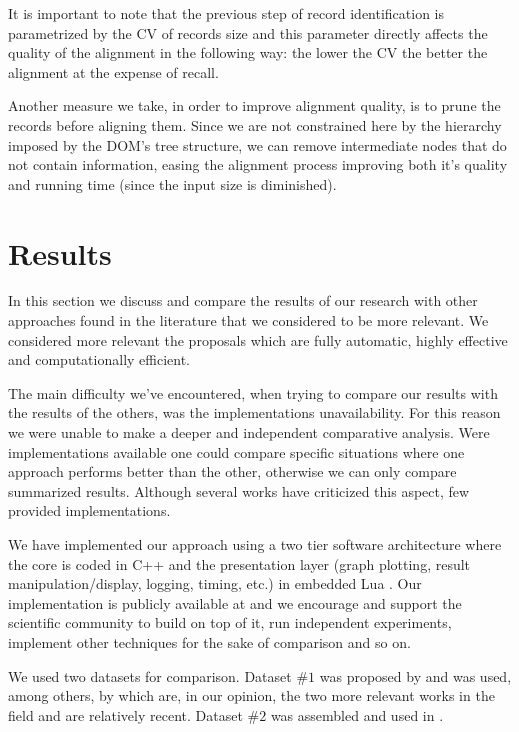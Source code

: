 \documentclass{vldb}
\begin{document}
It is important to note that the previous step of record identification is
parametrized by the CV of records size and this parameter directly affects the
quality of the alignment in the following way: the lower the CV the better the
alignment at the expense of recall.

Another measure we take, in order to improve alignment quality, is to prune the
records before aligning them. Since we are not constrained here by the hierarchy
imposed by the DOM's tree structure, we can remove intermediate nodes that do
not contain information, easing the alignment process improving both it's
quality and running time (since the input size is diminished).

\section{Results}\label{sec:result}

In this section we discuss and compare the results of our research with other
approaches found in the literature that we considered to be more relevant. We
considered more relevant the proposals which are fully automatic, highly
effective and computationally efficient. 

The main difficulty we've encountered, when trying to compare our results with
the results of the others, was the implementations unavailability. For this
reason we were unable to make a deeper and independent comparative analysis.
Were implementations available one could compare specific situations where one
approach performs better than the other, otherwise we can only compare
summarized results. Although several works have criticized this aspect, few
provided implementations.

We have implemented our approach using a two tier software architecture where
the core is coded in C++ and the presentation layer (graph plotting, result
manipulation/display, logging, timing, etc.) in embedded Lua \cite{luahome}.
Our implementation is publicly available at \cite{} and we encourage and support
the scientific community to build on top of it, run independent experiments,
implement other techniques for the sake of comparison and so on.

We used two datasets for comparison. Dataset $\#1$ was proposed by
\cite{yamada2004testbed} and was used, among others, by \cite{TPC09,clustVX2014}
which are, in our opinion, the two more relevant works in the field and are
relatively recent. Dataset $\#2$ was assembled and used in \cite{clustVX2014}.
\end{document}
